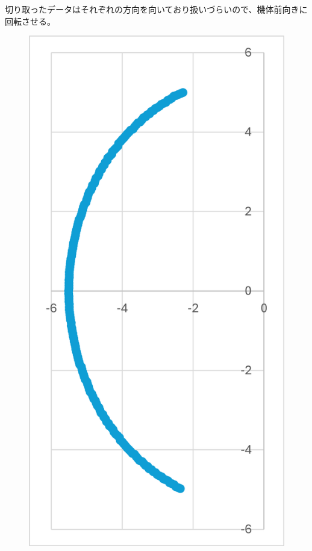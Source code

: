 \documentclass[dvipdfmx,a4paper]{jsarticle}
\begin{document}
    切り取ったデータはそれぞれの方向を向いており扱いづらいので、機体前向きに回転させる。
    \begin{figure}[H]
      \begin{minipage}[b]{0.45\linewidth}
        \centering
        \includegraphics[keepaspectratio, scale=0.5]{Photo/画像1.png}

\end{minipage}
\end{figure}
\end{document}
